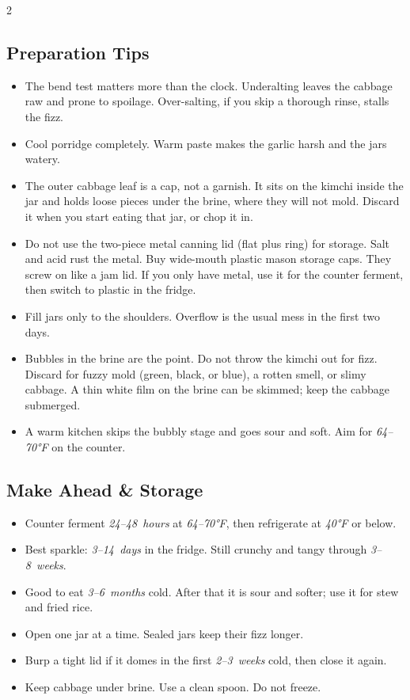 \documentclass[11pt,letterpaper]{article}
\begin{document}
{\begin{multicols}{2}
\subsection*{Preparation Tips}
\begin{itemize}
    \item The bend test matters more than the clock. Underalting leaves the cabbage raw and prone to spoilage. Over-salting, if you skip a thorough rinse, stalls the fizz.
    \item Cool porridge completely. Warm paste makes the garlic harsh and the jars watery.
    \item The outer cabbage leaf is a cap, not a garnish. It sits on the kimchi inside the jar and holds loose pieces under the brine, where they will not mold. Discard it when you start eating that jar, or chop it in.
    \item Do not use the two-piece metal canning lid (flat plus ring) for storage. Salt and acid rust the metal. Buy wide-mouth plastic mason storage caps. They screw on like a jam lid. If you only have metal, use it for the counter ferment, then switch to plastic in the fridge.
    \item Fill jars only to the shoulders. Overflow is the usual mess in the first two days.
    \item Bubbles in the brine are the point. Do not throw the kimchi out for fizz. Discard for fuzzy mold (green, black, or blue), a rotten smell, or slimy cabbage. A thin white film on the brine can be skimmed; keep the cabbage submerged.
    \item A warm kitchen skips the bubbly stage and goes sour and soft. Aim for \textit{64--70°F} on the counter.
\end{itemize}

\subsection*{Make Ahead \& Storage}
\begin{itemize}
    \item Counter ferment \textit{24--48~hours} at \textit{64--70°F}, then refrigerate at \textit{40°F} or below.
    \item Best sparkle: \textit{3--14~days} in the fridge. Still crunchy and tangy through \textit{3--8~weeks}.
    \item Good to eat \textit{3--6~months} cold. After that it is sour and softer; use it for stew and fried rice.
    \item Open one jar at a time. Sealed jars keep their fizz longer.
    \item Burp a tight lid if it domes in the first \textit{2--3~weeks} cold, then close it again.
    \item Keep cabbage under brine. Use a clean spoon. Do not freeze.
\end{itemize}


\end{multicols}}
\end{document}
